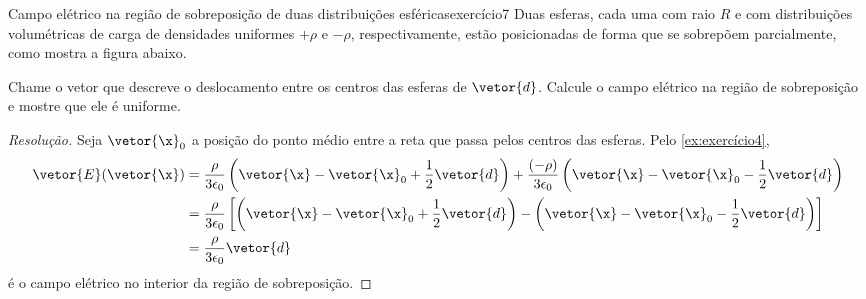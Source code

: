 \begin{exercício}{Campo elétrico na região de sobreposição de duas distribuições esféricas}{exercício7}
    Duas esferas, cada uma com raio \(R\) e com distribuições volumétricas de carga de densidades uniformes \(+\rho\) e \(-\rho\), respectivamente, estão posicionadas de forma que se sobrepõem parcialmente, como mostra a figura abaixo.
    \begin{center}
    \end{center}
    Chame o vetor que descreve o deslocamento entre os centros das esferas de \(\vetor{d}\). Calcule o campo elétrico na região de sobreposição e mostre que ele é uniforme.
\end{exercício}
\begin{proof}[Resolução]
    Seja \(\vetor{\x}_0\) a posição do ponto médio entre a reta que passa pelos centros das esferas. Pelo \cref{ex:exercício4},
    \begin{align*}
        \vetor{E}(\vetor{\x}) &= \frac{\rho}{3\epsilon_0}\left(\vetor{\x} - \vetor{\x}_0 + \frac12 \vetor{d}\right) + \frac{(-\rho)}{3 \epsilon_0}\left(\vetor{\x} - \vetor{\x}_0 - \frac12\vetor{d}\right)\\
                              &= \frac{\rho}{3 \epsilon_0}\left[\left(\vetor{\x} - \vetor{\x}_0 + \frac12 \vetor{d}\right) - \left(\vetor{\x} - \vetor{\x}_0 - \frac12 \vetor{d}\right)\right]\\
                              &= \frac{\rho}{3 \epsilon_0}\vetor{d}
    \end{align*}
    é o campo elétrico no interior da região de sobreposição.
\end{proof}
